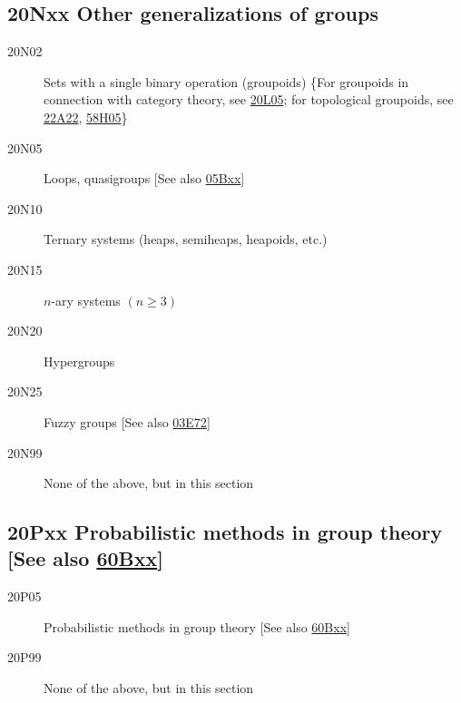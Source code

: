 \documentclass[letterpaper]{article}
\begin{document}
\subsection*{20Nxx  Other generalizations of groups }\label{20Nxx}
\begin{description} 
\item [20N02]\label{20N02} Sets with a single binary operation (groupoids) \{For groupoids in connection with category theory, see \hyperref[20L05]{20L05}; for topological groupoids, see \hyperref[22A22]{22A22}, \hyperref[58H05]{58H05}\}
\item [20N05]\label{20N05} Loops, quasigroups [See also \hyperref[05Bxx]{05Bxx}]
\item [20N10]\label{20N10} Ternary systems (heaps, semiheaps, heapoids, etc.)
\item [20N15]\label{20N15} $n$-ary systems $(n\ge 3)$
\item [20N20]\label{20N20} Hypergroups
\item [20N25]\label{20N25} Fuzzy groups [See also \hyperref[03E72]{03E72}]
\item [20N99]\label{20N99} None of the above, but in this section
\end{description}
\subsection*{20Pxx  Probabilistic methods in group theory [See also \hyperref[60Bxx]{60Bxx}] }\label{20Pxx}
\begin{description} 
\item [20P05]\label{20P05} Probabilistic methods in group theory [See also \hyperref[60Bxx]{60Bxx}]
\item [20P99]\label{20P99} None of the above, but in this section
\end{description}
\end{document}
